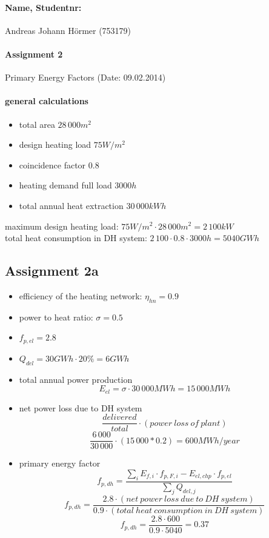 \documentclass{article}
\begin{document}
	\paragraph{Name, Studentnr: }Andreas Johann H\"ormer (753179)
	\paragraph{Assignment 2}Primary Energy Factors (Date: 09.02.2014)
	\paragraph{general calculations}
		\begin{itemize}
			\item total area $28\,000m^2$
			\item design heating load $75W/m^2$
			\item coincidence factor $0.8$
			\item heating demand full load $3000h$
			\item total annual heat extraction $30\,000kWh$
		\end{itemize}
		maximum design heating load: $75W/m^2\cdot 28\,000m^2 = 2\,100kW$\\
		total heat consumption in DH system: $2\,100\cdot 0.8\cdot 3000h = 5040GWh$\\

	\newpage
	\subsection*{Assignment 2a}
		\begin{itemize}
			\item efficiency of the heating network: $\eta_{hn}=0.9$
			\item power to heat ratio: $\sigma=0.5$
			\item $f_{p,el}=2.8$
			\item $Q_{del}=30GWh\cdot 20\%=6GWh$
			\item total annual power production\\
				$$E_{el}=\sigma \cdot 30\,000MWh = 15\,000MWh$$
			\item net power loss due to DH system\\
				$$\frac{delivered}{total}\cdot (power\ loss\ of\ plant)$$
				$$\frac{6\,000}{30\,000}\cdot (15\,000*0.2) = 600MWh/year$$
			\item primary energy factor\\
				$$f_{p,dh}=\frac{\sum_i E_{f,i}\cdot f_{p,F,i}-E_{el,chp}\cdot f_{p,el}}{\sum_j Q_{del,j}}$$
				$$f_{p,dh}=\frac{2.8\cdot (net\ power\ loss\ due\ to\ DH\ system)}{0.9\cdot (total\ heat\ consumption\ in\ DH\ system)}$$
				$$f_{p,dh}=\frac{2.8\cdot 600}{0.9\cdot 5040} = 0.37$$
		\end{itemize}
\end{document}
